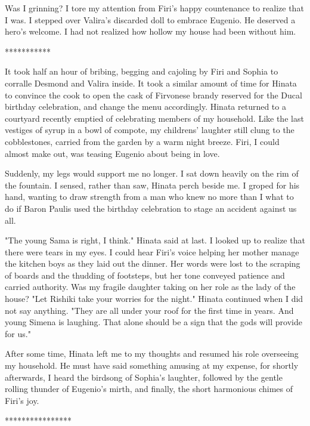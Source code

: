 \documentclass{article}
\begin{document}
Was I grinning? I tore my attention from Firi's happy countenance to realize that I was. I stepped over Valira's discarded doll to embrace Eugenio. He deserved a hero's welcome. I had not realized how hollow my house had been without him.

***********

It took half an hour of bribing, begging and cajoling by Firi and Sophia to corralle Desmond and Valira inside. It took a similar amount of time for Hinata to convince the cook to open the cask of Firvonese brandy reserved for the Ducal birthday celebration, and change the menu accordingly. Hinata returned to a courtyard recently emptied of celebrating members of my household. Like the last vestiges of syrup in a bowl of compote, my childrens' laughter still clung to the cobblestones, carried from the garden by a warm night breeze. Firi, I could almost make out, was teasing Eugenio about being in love.

Suddenly, my legs would support me no longer. I sat down heavily on the rim of the fountain. I sensed, rather than saw, Hinata perch beside me. I groped for his hand, wanting to draw strength from a man who knew no more than I what to do if Baron Paulis used the birthday celebration to stage an accident against us all.

"The young Sama is right, I think." Hinata said at last. I looked up to realize that there were tears in my eyes. I could hear Firi's voice helping her mother manage the kitchen boys as they laid out the dinner. Her words were lost to the scraping of boards and the thudding of footsteps, but her tone conveyed patience and carried authority. Was my fragile daughter taking on her role as the lady of the house? "Let Rishiki take your worries for the night." Hinata continued when I did not say anything. "They are all under your roof for the first time in years. And young Simena is laughing. That alone should be a sign that the gods will provide for us."

After some time, Hinata left me to my thoughts and resumed his role overseeing my household. He must have said something amusing at my expense, for shortly afterwards, I heard the birdsong of Sophia's laughter, followed by the gentle rolling thunder of Eugenio's mirth, and finally, the short harmonious chimes of Firi's joy.

****************
\end{document}
